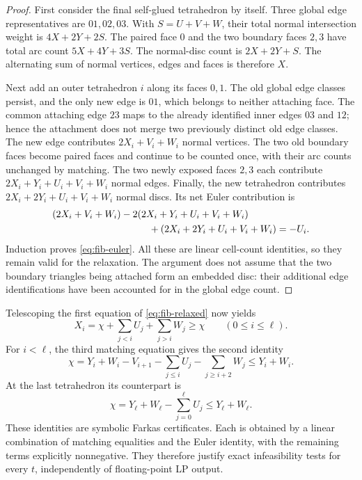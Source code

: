 \begin{proof}
First consider the final self-glued tetrahedron by itself.  Three global
edge representatives are $01,02,03$.  With $S=U+V+W$, their total normal
intersection weight is $4X+2Y+2S$.  The paired face $0$ and the two boundary
faces $2,3$ have total arc count $5X+4Y+3S$.  The normal-disc count is
$2X+2Y+S$.  The alternating sum of normal vertices, edges and faces is
therefore $X$.

Next add an outer tetrahedron $i$ along its faces $0,1$.  The old global
edge classes persist, and the only new edge is $01$, which belongs to
neither attaching face.  The common attaching edge $23$ maps to the already
identified inner edges $03$ and $12$; hence the attachment does not merge
two previously distinct old edge classes.  The new edge contributes
$2X_i+V_i+W_i$ normal vertices.  The two old boundary faces become paired
faces and continue to be counted once, with their arc counts unchanged by
matching.  The two newly exposed faces $2,3$ each contribute
$2X_i+Y_i+U_i+V_i+W_i$ normal edges.  Finally, the new tetrahedron contributes
$2X_i+2Y_i+U_i+V_i+W_i$ normal discs.  Its net Euler contribution is
\[
\begin{aligned}
 &(2X_i+V_i+W_i)
 -2(2X_i+Y_i+U_i+V_i+W_i)\\
 &\hspace{35mm}+(2X_i+2Y_i+U_i+V_i+W_i)=-U_i.
\end{aligned}
\]
Induction proves \eqref{eq:fib-euler}.  All these are linear cell-count
identities, so they remain valid for the relaxation.  The argument does
not assume that the two boundary triangles being attached form an embedded
disc: their additional edge identifications have been accounted for in the
global edge count.
\end{proof}

Telescoping the first equation of \eqref{eq:fib-relaxed} now yields
\begin{equation}
 X_i=\chi+\sum_{j<i}U_j+\sum_{j>i}W_j\ge\chi
 \qquad(0\le i\le\ell).
 \label{eq:fib-X-dual}
\end{equation}
For $i<\ell$, the third matching equation gives the second identity
\begin{equation}
 \chi=Y_i+W_i-V_{i+1}
       -\sum_{j\le i}U_j-\sum_{j\ge i+2}W_j
 \le Y_i+W_i.
 \label{eq:fib-Y-dual}
\end{equation}
At the last tetrahedron its counterpart is
\begin{equation}
 \chi=Y_\ell+W_\ell-\sum_{j=0}^{\ell}U_j
 \le Y_\ell+W_\ell.
 \label{eq:fib-last-dual}
\end{equation}
These identities are symbolic Farkas certificates.  Each is obtained by a
linear combination of matching equalities and the Euler identity, with the
remaining terms explicitly nonnegative.  They therefore justify exact
infeasibility tests for every $t$, independently of floating-point LP output.

